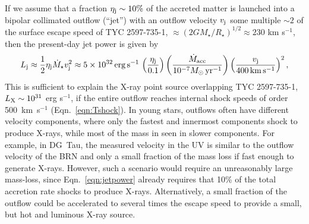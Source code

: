 \documentclass[linenumbers]{aastex631}
\newcommand{\be}{\begin{equation}}
\newcommand{\ee}{\end{equation}}
\begin{document}
If we assume that a fraction $\eta_{\rm j} \sim 10\%$ of the accreted matter is launched into a bipolar collimated outflow (``jet'') with an outflow velocity $v_{\rm j}$ some multiple $\sim 2$ of the surface escape speed of TYC 2597-735-1, $\approx (2GM_{\star}/R_{\star})^{1/2} \approx 230$ km s$^{-1}$, then the present-day jet power is given by
\be
L_{\rm j} \approx \frac{1}{2}\eta_{\rm j}\dot{M}_{\star}v_{\rm j}^{2} \approx 5\times 10^{32}\,{\rm erg\,s^{-1}}\,\left(\frac{\eta_{\rm j}}{0.1}\right)\left(\frac{\dot{M}_{\rm acc}}{10^{-7}M_{\odot}\,\rm yr^{-1}}\right)\left(\frac{v_{\rm j}}{400\,{\rm km\,s^{-1}}}\right)^{2},
\label{eqn:jetpower}
\ee
This is sufficient to explain the X-ray point source overlapping TYC 2597-735-1, $L_{\rm X} \sim 10^{31}$ erg s$^{-1}$, if the entire outflow reaches internal shock speeds of order 500~km~s$^{-1}$ (Eqn.~\ref{eqn:Tshock}).
In young stars, outflows often have different velocity components, where only the fastest and innermost components shock to produce X-rays, while most of the mass in seen in slower components. For example, in DG~Tau, the measured velocity in the UV is similar to the outflow velocity of the BRN and only a small fraction of the mass loss if fast enough to generate X-rays. However, such a scenario would require an unreasonably large mass-loss, since Eqn.~\ref{eqn:jetpower} already requires that 10\% of the total accretion rate shocks to produce X-rays. Alternatively, a small fraction of the outflow could be accelerated to several times the escape speed to provide a small, but hot and luminous X-ray source.
\end{document}
